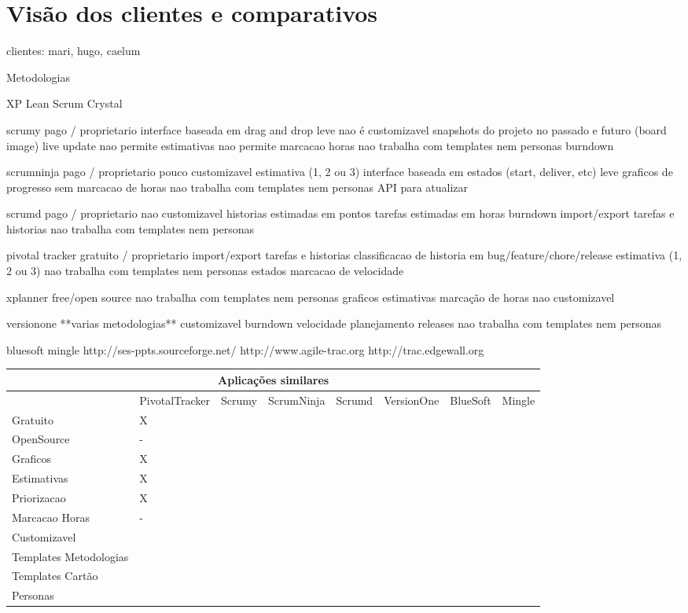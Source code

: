 \section{Visão dos clientes e comparativos}

clientes: mari, hugo, caelum

Metodologias

XP
Lean
Scrum
Crystal


scrumy
	pago / proprietario
	interface baseada em drag and drop
	leve
	nao é customizavel
	snapshots do projeto no passado e futuro (board image)
	live update
	nao permite estimativas
	nao permite marcacao horas
	nao trabalha com templates nem personas
	burndown
	
scrumninja
	pago / proprietario
	pouco customizavel
	estimativa (1, 2 ou 3)
	interface baseada em estados (start, deliver, etc)
	leve
	graficos de progresso
	sem marcacao de horas
	nao trabalha com templates nem personas
	API para atualizar 

scrumd
  pago / proprietario
  nao customizavel
  historias estimadas em pontos
  tarefas estimadas em horas
  burndown
	import/export tarefas e historias
	nao trabalha com templates nem personas

pivotal tracker
	gratuito / proprietario
	import/export tarefas e historias
	classificacao de historia em bug/feature/chore/release
	estimativa (1, 2 ou 3)
	nao trabalha com templates nem personas
	estados
	marcacao de velocidade
	
xplanner
	free/open source
	nao trabalha com templates nem personas
	graficos
	estimativas
	marcação de horas
	nao customizavel
	
versionone
	**varias metodologias**
	customizavel
	burndown
	velocidade
	planejamento releases
	nao trabalha com templates nem personas

bluesoft
mingle
http://ses-ppts.sourceforge.net/
http://www.agile-trac.org
http://trac.edgewall.org


\begin{sidewaystable}
	\begin{tabular}{|l|l|l|l|l|l|l|l}
		\hline
		\multicolumn{8}{|c|}{Aplicações similares} \\
		\hline
		 & PivotalTracker & Scrumy & ScrumNinja & Scrumd & VersionOne & BlueSoft & Mingle \\
		Gratuito & X & & & & & & \\
		OpenSource & - & & & & & & \\
		Graficos & X & & & & & & \\
		Estimativas & X & & & & & & \\
		Priorizacao & X & & & & & & \\
		Marcacao Horas & - & & & & & & \\
		Customizavel & & & & & & & \\
		Templates Metodologias & & & & & & & \\
		Templates Cartão & & & & & & & \\
		Personas & & & & & & & \\
		\hline
	\end{tabular}
\end{sidewaystable}


